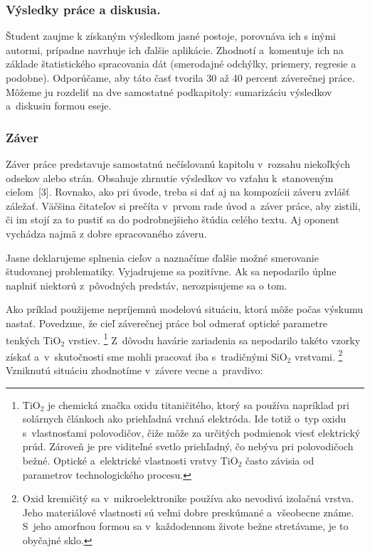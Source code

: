 \subsubsection*{\normalsize Výsledky práce a diskusia.}
Študent zaujme k získaným výsledkom jasné postoje, 
porovnáva ich s inými autormi, prípadne navrhuje ich ďalšie aplikácie.
Zhodnotí a~komentuje ich na základe štatistického spracovania dát (smerodajné odchýlky, priemery, regresie a podobne).
Odporúčame, aby táto časť tvorila 30 až 40 percent záverečnej práce. 
Môžeme ju rozdeliť na dve samostatné podkapitoly: sumarizáciu výsledkov a~diskusiu formou eseje.

\subsubsection{Záver}
Záver práce predstavuje samostatnú nečíslovanú kapitolu
v~rozsahu niekoľkých odsekov alebo strán.
Obsahuje zhrnutie výsledkov vo vzťahu k~stanoveným cieľom~[3]. 
Rovnako, ako pri úvode, treba si dať
aj na kompozícii záveru zvlášť záležať.
Väčšina čitateľov si prečíta v~prvom rade úvod a~záver práce,
aby zistili, či im stojí za to pustiť sa do podrobnejšieho
štúdia celého textu.
Aj oponent vychádza najmä z dobre spracovaného záveru. 

Jasne deklarujeme splnenia cieľov a naznačíme ďalšie možné smerovanie študovanej problematiky. Vyjadrujeme sa pozitívne. Ak sa nepodarilo úplne naplniť niektorú z~pôvodných predstáv, nerozpisujeme sa o tom.

Ako príklad použijeme nepríjemnú modelovú situáciu,
ktorá môže počas výskumu nastať.
Povedzme, že cieľ záverečnej práce bol odmerať
optické parametre tenkých TiO$_2$ vrstiev.%
\footnote{TiO$_2$ je chemická značka oxidu titaničitého,
ktorý sa používa napríklad pri solárnych článkoch
ako priehľadná vrchná elektróda.
Ide totiž o~typ oxidu s~vlastnosťami polovodičov,
čiže môže za určitých podmienok viesť elektrický prúd.
Zároveň je pre viditeľné svetlo priehľadný,
čo nebýva pri polovodičoch bežné.
Optické a~elektrické vlastnosti vrstvy TiO$_2$
často závisia od parametrov technologického procesu.}
Z~dôvodu havárie zariadenia sa nepodarilo takéto vzorky získať 
a~v~skutočnosti sme mohli pracovať iba
s~tradičnými SiO$_2$ vrstvami.%
\footnote{Oxid kremičitý sa v~mikroelektronike používa
ako nevodivá izolačná vrstva.
Jeho materiálové vlastnosti sú veľmi dobre preskúmané
a~všeobecne známe.
S~jeho amorfnou formou sa v~každodennom živote bežne stretávame, 
je to obyčajné sklo.}
Vzniknutú situáciu zhodnotíme v~závere vecne a~pravdivo:


